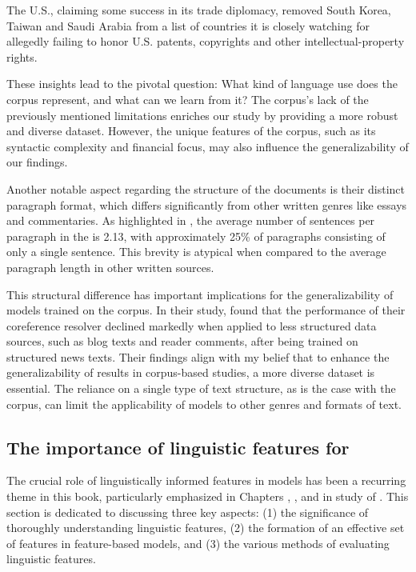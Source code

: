 \begin{exe}
	\ex\label{ex:copyrights} The U.S., claiming some success in its trade diplomacy, removed South Korea, Taiwan and Saudi Arabia from a list of countries it is closely watching for allegedly failing to honor U.S. patents, copyrights and other intellectual-property
	rights.
\end{exe}

These insights lead to the pivotal question: What kind of language use does the \wsj corpus represent, and what can we learn from it? The corpus's lack of the previously mentioned limitations enriches our study by providing a more robust and diverse dataset. However, the unique features of the \wsj corpus, such as its syntactic complexity and financial focus, may also influence the generalizability of our findings.

Another notable aspect regarding the structure of the \wsj documents is their distinct paragraph format, which differs significantly from other written genres like essays and commentaries. As highlighted in , the average number of sentences per paragraph in the \wsj is 2.13, with approximately 25\% of paragraphs consisting of only a single sentence. This brevity is atypical when compared to the average paragraph length in other written sources.

This structural difference has important implications for the generalizability of models trained on the \wsj corpus. In their study, \citet{hendrickx2009coreference} found that the performance of their coreference resolver declined markedly when applied to less structured data sources, such as blog texts and reader comments, after being trained on structured news texts. Their findings align with my belief that to enhance the generalizability of results in corpus-based studies, a more diverse dataset is essential. The reliance on a single type of text structure, as is the case with the \wsj corpus, can limit the applicability of models to other genres and formats of text.


\subsection{The importance of linguistic features for \context}\label{chap8_subsec:featurelim}

The crucial role of linguistically informed features in \context models has been a recurring theme in this book, particularly emphasized in Chapters \5, \6, and in study \studF of . This section is dedicated to discussing three key aspects: (1) the significance of thoroughly understanding linguistic features, (2) the formation of an effective set of features in feature-based models, and (3) the various methods of evaluating linguistic features.

